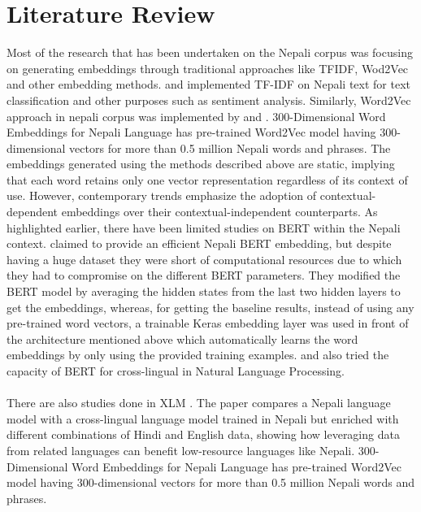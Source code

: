 \chapter{Literature Review}
Most of the research that has been undertaken on the Nepali corpus was focusing on generating embeddings through traditional approaches like TFIDF, Wod2Vec and other embedding methods. \cite{Bhatta_Shrestha_Nepal_Pandey_Koirala_2020} \cite{Singh2019NepaliMT} \cite{shahi2018nepali} and \cite{ghosh2018class} implemented TF-IDF on Nepali text for text classification and other purposes such as sentiment analysis. Similarly, Word2Vec approach in nepali corpus was implemented by \cite{Bhatta_Shrestha_Nepal_Pandey_Koirala_2020} \cite{kaushal2016} and \cite{basnet2018improving}. 300-Dimensional Word Embeddings for Nepali Language \cite{300D} has pre-trained Word2Vec model having 300-dimensional vectors for more than 0.5 million Nepali words and phrases. The embeddings generated using the methods described above are static, implying that each word retains only one vector representation regardless of its context of use. However, contemporary trends emphasize the adoption of contextual-dependent embeddings over their contextual-independent counterparts. As highlighted earlier, there have been limited studies on BERT within the Nepali context. \cite{koirala-niraula-2021-npvec1} claimed to provide an efficient Nepali BERT embedding, but despite having a huge dataset they were short of computational resources due to which they had to compromise on the different BERT parameters. They modified the BERT model by averaging the hidden states from the last two hidden layers to get the embeddings, whereas, for getting the baseline results, instead of using any pre-trained word vectors, a trainable Keras embedding layer was used in front of the architecture mentioned above which automatically learns the word embeddings by only using the provided training examples. \cite{rajan_nepalibert_2021} and  \cite{milanmg_bert-nepali_2022} also tried the capacity of BERT for cross-lingual in Natural Language Processing. \\\\
There are also studies done in XLM \cite{NEURIPS2019_c04c19c2}. The paper compares a Nepali language model with a cross-lingual language model trained in Nepali but enriched with different combinations of Hindi and English data, showing how leveraging data from related languages can benefit low-resource languages like Nepali.
300-Dimensional Word Embeddings for Nepali Language \cite{300D} has pre-trained Word2Vec model having 300-dimensional vectors for more than 0.5 million Nepali words and phrases.
